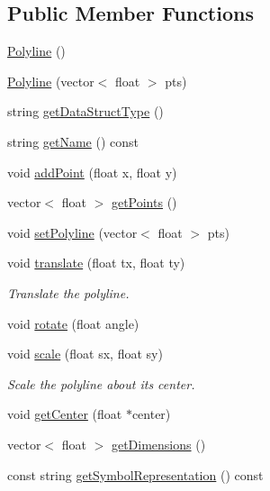 \subsection*{Public Member Functions}
\begin{DoxyCompactItemize}
\item 
\mbox{\hyperlink{classbridges_1_1datastructure_1_1_polyline_a488f6612485fc66534035c3574281a11}{Polyline}} ()
\item 
\mbox{\hyperlink{classbridges_1_1datastructure_1_1_polyline_aceb69c3294ab4c16b2931e1073d3f996}{Polyline}} (vector$<$ float $>$ pts)
\item 
string \mbox{\hyperlink{classbridges_1_1datastructure_1_1_polyline_a49b37ad55cf64fe759ee5a0f46e2e0cc}{get\+Data\+Struct\+Type}} ()
\item 
string \mbox{\hyperlink{classbridges_1_1datastructure_1_1_polyline_a46f2830cd85a09e9c4d62d54110dbe13}{get\+Name}} () const
\item 
void \mbox{\hyperlink{classbridges_1_1datastructure_1_1_polyline_a00698223911f07cafca29ec80c507678}{add\+Point}} (float x, float y)
\item 
vector$<$ float $>$ \mbox{\hyperlink{classbridges_1_1datastructure_1_1_polyline_a634034b6874af45e2b8c56d70e8725c5}{get\+Points}} ()
\item 
void \mbox{\hyperlink{classbridges_1_1datastructure_1_1_polyline_ab1fb850dabd3ed58fd4f916992a0b9a6}{set\+Polyline}} (vector$<$ float $>$ pts)
\item 
void \mbox{\hyperlink{classbridges_1_1datastructure_1_1_polyline_a0b651b1c383b228f8d473232e64e4bda}{translate}} (float tx, float ty)
\begin{DoxyCompactList}\small\item\em Translate the polyline. \end{DoxyCompactList}\item 
void \mbox{\hyperlink{classbridges_1_1datastructure_1_1_polyline_aa61978ccbb0b086dc8f55e90ccca23c9}{rotate}} (float angle)
\item 
void \mbox{\hyperlink{classbridges_1_1datastructure_1_1_polyline_adf06f484d9a48960de84ed3646903f3a}{scale}} (float sx, float sy)
\begin{DoxyCompactList}\small\item\em Scale the polyline about its center. \end{DoxyCompactList}\item 
void \mbox{\hyperlink{classbridges_1_1datastructure_1_1_polyline_ad0783deb77873eda19528681bbbca25c}{get\+Center}} (float $\ast$center)
\item 
vector$<$ float $>$ \mbox{\hyperlink{classbridges_1_1datastructure_1_1_polyline_aebcd7f4f80e2eed35057e5b1d82ba4e7}{get\+Dimensions}} ()
\item 
const string \mbox{\hyperlink{classbridges_1_1datastructure_1_1_polyline_a176c06400a3b105fa651c69891381201}{get\+Symbol\+Representation}} () const
\end{DoxyCompactItemize}
